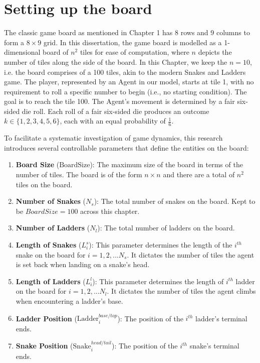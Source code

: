 \section{Setting up the board}
The classic game board as mentioned in Chapter 1 has 8 rows and 9 columns to form a $8 \times 9$ grid. In this dissertation, the game board is modelled as a 1-dimensional board of $n^2$ tiles for ease of computation, where $n$ depicts the number of tiles along the side of the board. In this Chapter, we keep the $n=10$, i.e. the board comprises of a 100 tiles, akin to the modern Snakes and Ladders game. The player, represented by an Agent in our model, starts at tile 1, with no requirement to roll a specific number to begin (i.e., no starting condition). The goal is to reach the tile 100. The Agent's movement is determined by a fair six-sided die roll. Each roll of a fair six-sided die produces an outcome $k \in \{1, 2, 3, 4, 5, 6\}$, each with an equal probability of $\frac{1}{6}$.

To facilitate a systematic investigation of game dynamics, this research introduces several controllable parameters that define the entities on the board:

\begin{enumerate}
	\item \textbf{Board Size }($\text{BoardSize}$): The maximum size of the board in terms of the number of tiles. The board is of the form $n \times n$ and there are a total of $n^2$ tiles on the board.
	\item \textbf{Number of Snakes} ($N_{s}$): The total number of snakes on the board. Kept to be $BoardSize = 100$ across this chapter.
	\item \textbf{Number of Ladders } ($N_{l}$): The total number of ladders on the board.
	\item \textbf{Length of Snakes }($L^{s}_{i}$): This parameter determines the length of the $i^{th}$ snake on the board for $i=1,2,... N_{s}$. It dictates the number of tiles the agent is set back when landing on a snake's head.
	\item \textbf{Length of Ladders} ($L^{l}_{i}$): This parameter determines the length of $i^{th}$ ladder on the board for $i=1,2,... N_{l}$. It dictates the number of tiles the agent climbs when encountering a ladder's base.
	\item \textbf{Ladder Position} ($\text{Ladder}^{base/top}_{i}$): The position of the $i^{th}$ ladder's terminal ends.
	\item \textbf{Snake Position} ($\text{Snake}^{head/tail}_{i}$): The position of the $i^{th}$ snake's terminal ends.
\end{enumerate}

